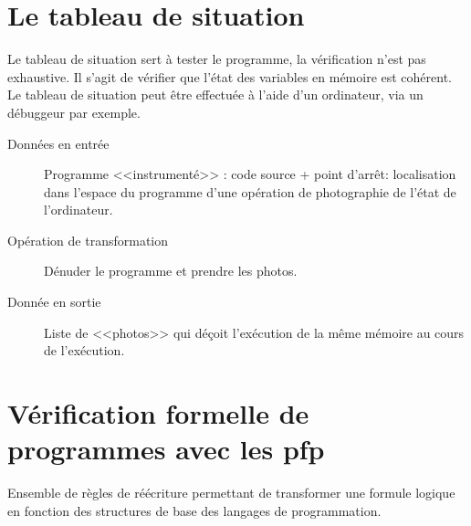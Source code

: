\section{Le tableau de situation}\label{tableauSituation}
		Le tableau de situation sert à tester le programme, la vérification n'est pas exhaustive. Il s'agit de vérifier que l'état des variables en
		mémoire est cohérent. Le tableau de situation peut être effectuée à l'aide d'un ordinateur, via un débuggeur par exemple. 
			\begin{description}
				\item[Données en entrée] Programme <<instrumenté>> : code source + point d'arrêt: 
					localisation dans l'espace du programme d'une opération de photographie de l'état de l'ordinateur.
				\item[Opération de transformation] Dénuder le programme et prendre les photos. 
				\item[Donnée en sortie] Liste de <<photos>> qui déçoit l'exécution de la même mémoire au cours de l'exécution.
			\end{description}
\section{Vérification formelle de programmes avec les pfp}\label{pfp}
		Ensemble de règles de réécriture permettant de transformer une formule logique en fonction des structures de base des langages de programmation.

